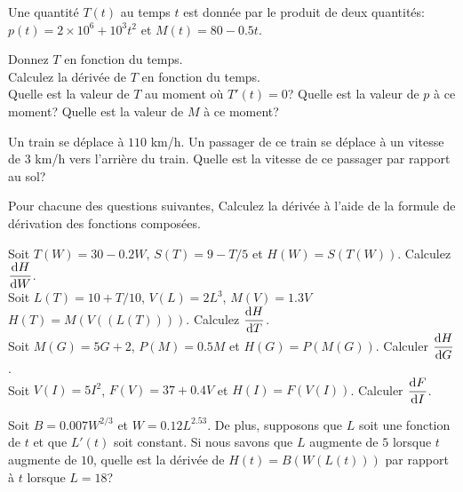 \begin{question}
Une quantité $T(t)$ au temps $t$ est donnée par le produit de deux
quantités: $p(t) = 2\times 10^6 + 10^3 t^2$ et $M(t) = 80 - 0.5 t$.

 Donnez $T$ en fonction du temps.\\
 Calculez la dérivée de $T$ en fonction du temps.\\
 Quelle est la valeur de $T$ au moment où $T'(t) = 0$?
Quelle est la valeur de $p$ à ce moment?  Quelle est la valeur de $M$
à ce moment?
\label{5Q22}
\end{question}

\begin{question}
Un train se déplace à $110$ km/h.  Un passager de ce train se déplace
à un vitesse de $3$ km/h vers l'arrière du train.  Quelle est la
vitesse de ce passager par rapport au sol?
\label{5Q23}
\end{question}

\begin{question}
Pour chacune des questions suivantes, Calculez la dérivée à l'aide de
la formule de dérivation des fonctions composées.

 Soit $T(W) = 30 -0.2W$, $S(T) = 9 -T/5$ et $H(W) = S(T(W))$.
Calculez $\displaystyle \frac{\mathrm{d}H}{\mathrm{d}W}$.\\
 Soit $L(T) = 10+T/10$, $V(L) = 2L^3$, $M(V) = 1.3V$
$H(T) = M(V((L(T))))$.  Calculez $\displaystyle \frac{\mathrm{d}H}{\mathrm{d}T}$.\\
 Soit $M(G) = 5G+2$, $P(M) = 0.5 M$ et $H(G)=P(M(G))$.
Calculer $\displaystyle \frac{\mathrm{d}H}{\mathrm{d}G}$.\\
 Soit $V(I) = 5 I^2$, $F(V) = 37 + 0.4 V$ et $H(I) = F(V(I))$.
Calculer $\displaystyle \frac{\mathrm{d}F}{\mathrm{d}I}$.  
\label{5Q24}
\end{question}

\begin{question}
Soit $B=0.007 W^{2/3}$ et $W=0.12 L^{2.53}$.  De plus, supposons que
$L$ soit une fonction de $t$ et que $L'(t)$ soit constant.  Si nous
savons que $L$ augmente de $5$ lorsque $t$ augmente de $10$, quelle
est la dérivée de $H(t) = B(W(L(t)))$ par rapport à $t$ lorsque $L = 18$?
\label{5Q25}
\end{question}

